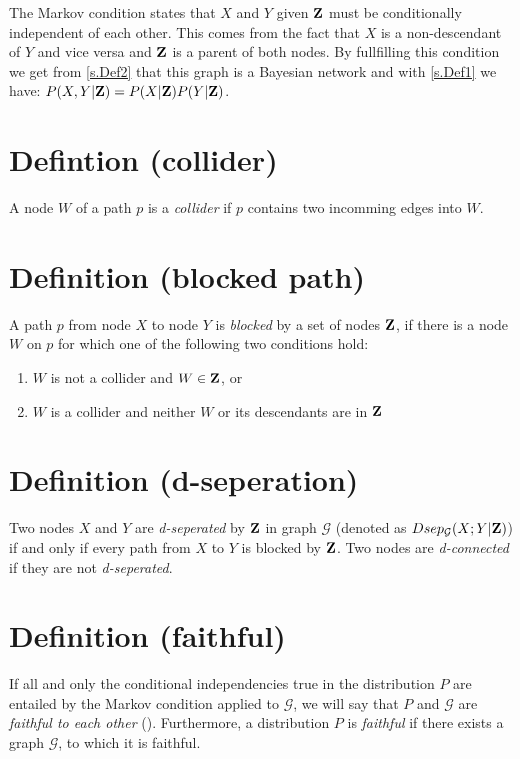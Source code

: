 		The Markov condition states that $X$ and $Y$ given ${\textbf{Z}}$ must be conditionally independent of each other. This comes from the fact that $X$ is a non-descendant of $Y$ and vice versa and ${\textbf{Z}}$ is a parent of both nodes. By fullfilling this condition we get from \autoref{s.Def2} that this graph is a Bayesian network and with \autoref{s.Def1} we have: $P(X , Y|{\textbf{Z}}) = P(X|{\textbf{Z}})P(Y|{\textbf{Z}})$.

	\section{Defintion (collider)} \label{s.Def4}

		A node $W$ of a path $p$ is a \textit{collider} if $p$ contains two incomming edges into $W$.

	\section{Definition (blocked path)} \label{s.Def5}

		A path $p$ from node $X$ to node $Y$ is \textit{blocked} by a set of nodes ${\textbf{Z}}$, if there is a node $W$ on $p$ for which one of the following two conditions hold:

		\begin{enumerate}
			\item $W$ is not a collider and $W \in {\textbf{Z}}$, or
			\item $W$ is a collider and neither $W$ or its descendants are in ${\textbf{Z}}$ \cite{P88}
		\end{enumerate}

	\section{Definition (d-seperation)} \label{s.Def6}

		Two nodes $X$ and $Y$ are \textit{d-seperated} by ${\textbf{Z}}$ in graph $\mathcal{G}$ (denoted as $Dsep_{\mathcal{G}}(X;Y|{\textbf{Z}})$) if and only if every path from $X$ to $Y$ is blocked by ${\textbf{Z}}$. Two nodes are \textit{d-connected} if they are not \textit{d-seperated}.

	\section{Definition (faithful)} \label{s.Def7}

		If all and only the conditional independencies true in the distribution $P$ are entailed by the Markov condition applied to $\mathcal{G}$, we will say that $P$ and $\mathcal{G}$ are \textit{faithful to each other} (\cite{SGSN}). Furthermore, a distribution $P$ is \textit{faithful} if there exists a graph $\mathcal{G}$, to which it is faithful.

